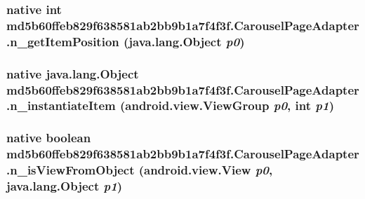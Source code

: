 \hypertarget{classmd5b60ffeb829f638581ab2bb9b1a7f4f3f_1_1_carousel_page_adapter_75d9241e07e6bf015c0511c0906a7328}{
\subsubsection[{n\_\-getItemPosition}]{\setlength{\rightskip}{0pt plus 5cm}native int md5b60ffeb829f638581ab2bb9b1a7f4f3f.CarouselPageAdapter.n\_\-getItemPosition (java.lang.Object {\em p0})}}
\label{classmd5b60ffeb829f638581ab2bb9b1a7f4f3f_1_1_carousel_page_adapter_75d9241e07e6bf015c0511c0906a7328}


\hypertarget{classmd5b60ffeb829f638581ab2bb9b1a7f4f3f_1_1_carousel_page_adapter_ccd3c513ad78492649a0f8621015a5a0}{
\subsubsection[{n\_\-instantiateItem}]{\setlength{\rightskip}{0pt plus 5cm}native java.lang.Object md5b60ffeb829f638581ab2bb9b1a7f4f3f.CarouselPageAdapter.n\_\-instantiateItem (android.view.ViewGroup {\em p0}, \/  int {\em p1})}}
\label{classmd5b60ffeb829f638581ab2bb9b1a7f4f3f_1_1_carousel_page_adapter_ccd3c513ad78492649a0f8621015a5a0}


\hypertarget{classmd5b60ffeb829f638581ab2bb9b1a7f4f3f_1_1_carousel_page_adapter_7750bcfc405f4a308f76c5546d8d0e40}{
\subsubsection[{n\_\-isViewFromObject}]{\setlength{\rightskip}{0pt plus 5cm}native boolean md5b60ffeb829f638581ab2bb9b1a7f4f3f.CarouselPageAdapter.n\_\-isViewFromObject (android.view.View {\em p0}, \/  java.lang.Object {\em p1})}}
\label{classmd5b60ffeb829f638581ab2bb9b1a7f4f3f_1_1_carousel_page_adapter_7750bcfc405f4a308f76c5546d8d0e40}


